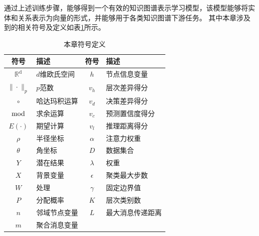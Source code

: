 \documentclass[algorithmlist, AutoFakeBold, AutoFakeSlant, figurelist, tablelist, nomlist, engineering]{seuthesix}
\begin{document}
通过上述训练步骤，能够得到一个有效的知识图谱表示学习模型，该模型能够将实体和关系表示为向量的形式，并能够用于各类知识图谱下游任务。
其中本章涉及到的相关符号及定义如表\ref{2_symbols}所示。
\begin{table}
  \centering
  \begin{tabular*}{0.8\textwidth}{@{\extracolsep{\fill}}clcl}
		\toprule[1pt]
    符号 & 描述 & 符号 & 描述 \\ \hline
    $\mathbb{R}^{\mathrm{d}}$ & $d$维欧氏空间 & $h$ & 节点信息变量\\
    $\|\cdot\|_{p}$ & $p$范数 & $v_h$ & 层次差异得分\\
    $\circ$ & 哈达玛积运算 & $v_d$ & 决策差异得分\\
    $\bmod$ & 求余运算 & $v_c$ & 预测置信度得分\\
    $E(\cdot)$ & 期望计算 & $v_l$ & 推理距离得分\\
    $\rho$ & 半径坐标 & $\alpha$ & 注意力权重\\
    $\theta$ & 角坐标 & $D$ & 数据集合\\
    $Y$ & 潜在结果 & $\lambda$ & 权重\\
    $X$ & 背景变量 & $\epsilon$ & 聚类最大步数\\
    $W$ & 处理 & $\gamma$ & 固定边界值\\
    $P$ & 分配概率 & $K$ & 层次类别数\\
    $n$ & 邻域节点变量 & $L$ & 最大消息传递距离\\
    $m$ & 聚合消息变量 & & \\
		\bottomrule[1pt]
	\end{tabular*}
  \caption{本章符号定义}
  \label{2_symbols}
\end{table}
\end{document}

